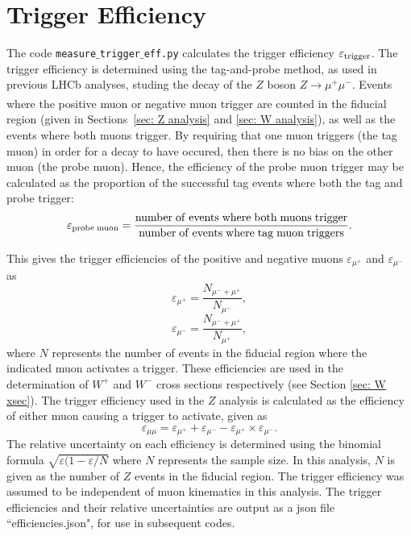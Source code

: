 \documentclass[a4paper,12pt]{article}
\begin{document}

\section{Trigger Efficiency} \label{sec: trig eff}
The code \texttt{measure$\_$trigger$\_$eff.py} calculates the trigger efficiency $\varepsilon_{\rm trigger}$. The trigger efficiency is determined using the tag-and-probe method, as used in previous LHCb analyses, studing the decay of the $Z$ boson $Z\xrightarrow[]{}\mu^+\mu^-$.
Events where the positive muon or negative muon trigger are counted in the fiducial region (given in Sections~\ref{sec: Z analysis} and \ref{sec: W analysis}), as well as the events where both muons trigger. 
By requiring that one muon triggers (the tag muon) in order for a decay to have occured, then there is no bias on the other muon (the probe muon). Hence, the efficiency of the probe muon trigger may be calculated as the proportion of the successful tag events where both the tag and probe trigger:
\begin{equation}
{\varepsilon}_{{\rm probe \;  muon}} = \frac{{\rm number \; of \; events \; where \; both \; muons \; trigger}}{{\rm number \; of \; events \; where \; tag \; muon \; triggers}}.
\end{equation}

This gives the trigger efficiencies of the positive and negative muons $\varepsilon_{\mu^+}$ and $\varepsilon_{\mu^-}$ as
\begin{equation}
    \varepsilon_{\mu^+} = \frac{N_{\mu^- + \mu^+}}{N_{\mu^-}},
    \label{eq: mup_eff}
\end{equation}
\begin{equation}
    \varepsilon_{\mu^-} = \frac{N_{\mu^- + \mu^+}}{N_{\mu^+}},
    \label{eq: mum_eff}
\end{equation}
where $N$ represents the number of events in the fiducial region where the indicated muon activates a trigger. 
These efficiencies are used in the determination of $W^+$ and $W^-$ cross sections respectively (see Section \ref{sec: W xsec}).
The trigger efficiency used in the $Z$ analysis is calculated as the efficiency of either muon causing a trigger to activate, given as
\begin{equation}
    \varepsilon_{\mu\mu} = \varepsilon_{\mu^+} + \varepsilon_{\mu^-} - \varepsilon_{\mu^+} \times \varepsilon_{\mu^-}.
    \label{eq: either eff}
\end{equation}
The relative uncertainty on each efficiency is determined using the binomial formula $\sqrt{\varepsilon(1-\varepsilon/N}$ where $N$ represents the sample size. In this analysis, $N$ is given as the number of $Z$ events in the fiducial region. The trigger efficiency was assumed to be independent of muon kinematics in this analysis.
The trigger efficiencies and their relative uncertainties are output as a json file ``efficiencies.json", for use in subsequent codes.
\end{document}
